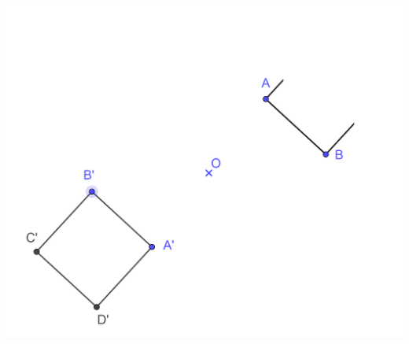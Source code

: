 \begin{questions}
	\begin{solution}
		\begin{center}
			\includegraphics[scale=0.3]{img/carre_corr}
		\end{center}
	\end{solution}
\end{questions}


